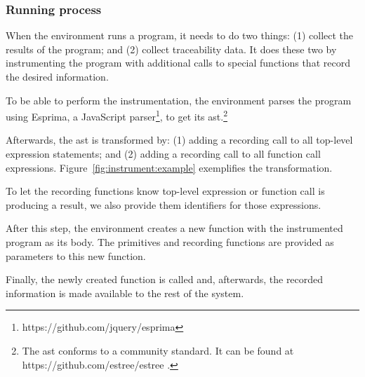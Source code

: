 %


\subsubsection{Running process}
When the environment runs a program, it needs to do two things: (1) collect the results of the program; and (2) collect traceability data.
It does these two by instrumenting the program with additional calls to special functions that record the desired information.

To be able to perform the instrumentation, the environment parses the program using Esprima, a JavaScript parser\footnote{https://github.com/jquery/esprima}, to get its \gls{ast}.\footnote{The \gls{ast} conforms to a community standard. It can be found at https://github.com/estree/estree .}

Afterwards, the \gls{ast} is transformed by: (1) adding a recording call to all top-level expression statements; and (2) adding a recording call to all function call expressions.
Figure~\ref{fig:instrument:example} exemplifies the transformation.

To let the recording functions know top-level expression or function call is producing a result, we also provide them identifiers for those expressions.

After this step, the environment creates a new function with the instrumented program as its body.
The primitives and recording functions are provided as parameters to this new function.

Finally, the newly created function is called and, afterwards, the recorded information is made available to the rest of the system.

